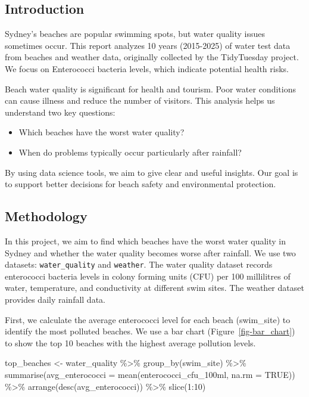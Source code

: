 \documentclass[
  11pt,
]{article}
\newenvironment{Shaded}{\begin{snugshade}}{\end{snugshade}}
\newcommand{\AttributeTok}[1]{\textcolor[rgb]{0.40,0.45,0.13}{#1}}
\newcommand{\ConstantTok}[1]{\textcolor[rgb]{0.56,0.35,0.01}{#1}}
\newcommand{\DecValTok}[1]{\textcolor[rgb]{0.68,0.00,0.00}{#1}}
\newcommand{\FunctionTok}[1]{\textcolor[rgb]{0.28,0.35,0.67}{#1}}
\newcommand{\NormalTok}[1]{\textcolor[rgb]{0.00,0.23,0.31}{#1}}
\newcommand{\OtherTok}[1]{\textcolor[rgb]{0.00,0.23,0.31}{#1}}
\newcommand{\SpecialCharTok}[1]{\textcolor[rgb]{0.37,0.37,0.37}{#1}}
\providecommand{\tightlist}{%
  \setlength{\itemsep}{0pt}\setlength{\parskip}{0pt}}\usepackage{longtable,booktabs,array}
\begin{document}
\subsection{Introduction}\label{introduction}

Sydney's beaches are popular swimming spots, but water quality issues
sometimes occur. This report analyzes 10 years (2015-2025) of water test
data from beaches and weather data, originally collected by the
TidyTuesday project. We focus on Enterococci bacteria levels, which
indicate potential health risks.

Beach water quality is significant for health and tourism. Poor water
conditions can cause illness and reduce the number of visitors. This
analysis helps us understand two key questions:

\begin{itemize}
\tightlist
\item
  Which beaches have the worst water quality?
\item
  When do problems typically occur particularly after rainfall?
\end{itemize}

By using data science tools, we aim to give clear and useful insights.
Our goal is to support better decisions for beach safety and
environmental protection.

\subsection{Methodology}\label{methodology}

In this project, we aim to find which beaches have the worst water
quality in Sydney and whether the water quality becomes worse after
rainfall. We use two datasets: \texttt{water\_quality} and
\texttt{weather}. The water quality dataset records enterococci bacteria
levels in colony forming units (CFU) per 100 millilitres of water,
temperature, and conductivity at different swim sites. The weather
dataset provides daily rainfall data.

First, we calculate the average enterococci level for each beach
(swim\_site) to identify the most polluted beaches. We use a bar chart
(Figure~\ref{fig-bar_chart}) to show the top 10 beaches with the highest
average pollution levels.

\begin{Shaded}
\begin{Highlighting}[]
\NormalTok{top\_beaches }\OtherTok{\textless{}{-}}\NormalTok{ water\_quality }\SpecialCharTok{\%\textgreater{}\%}
  \FunctionTok{group\_by}\NormalTok{(swim\_site) }\SpecialCharTok{\%\textgreater{}\%}
  \FunctionTok{summarise}\NormalTok{(}\AttributeTok{avg\_enterococci =} \FunctionTok{mean}\NormalTok{(enterococci\_cfu\_100ml, }\AttributeTok{na.rm =} \ConstantTok{TRUE}\NormalTok{)) }\SpecialCharTok{\%\textgreater{}\%}
  \FunctionTok{arrange}\NormalTok{(}\FunctionTok{desc}\NormalTok{(avg\_enterococci)) }\SpecialCharTok{\%\textgreater{}\%}
  \FunctionTok{slice}\NormalTok{(}\DecValTok{1}\SpecialCharTok{:}\DecValTok{10}\NormalTok{)}
\end{Highlighting}
\end{Shaded}
\end{document}
